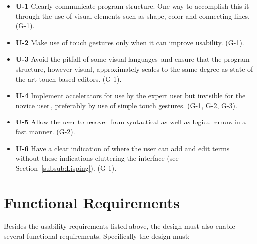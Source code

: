 \begin{itemize}     
	\item \textbf{U-1} Clearly communicate program structure. One way to accomplish this it through the use of visual elements such as shape, color and connecting lines. (G-1).
	\item \textbf{U-2} Make use of touch gestures only when it can improve usability. (G-1).
	\item \textbf{U-3} Avoid the pitfall of some visual languages\,\cite{green1992visual} and ensure that the program structure, however visual, approximately scales to the same degree as state of the art touch-based editors. (G-1).
	\item \textbf{U-4} Implement accelerators for use by the expert user but invisible for the novice user\,\cite{nielsen1990heuristic}, preferably by use of simple touch gestures. (G-1, G-2, G-3).
	\item \textbf{U-5} Allow the user to recover from syntactical as well as logical errors in a fast manner. (G-2).
	\item \textbf{U-6} Have a clear indication of where the user can add and edit terms without these indications cluttering the interface (see Section~\ref{subsub:Lisping}). (G-1).
\end{itemize}

\section{Functional Requirements} 
\label{subsec:FunctionalRequirements} 
Besides the usability requirements listed above, the design must also enable several functional requirements. Specifically the design must:

